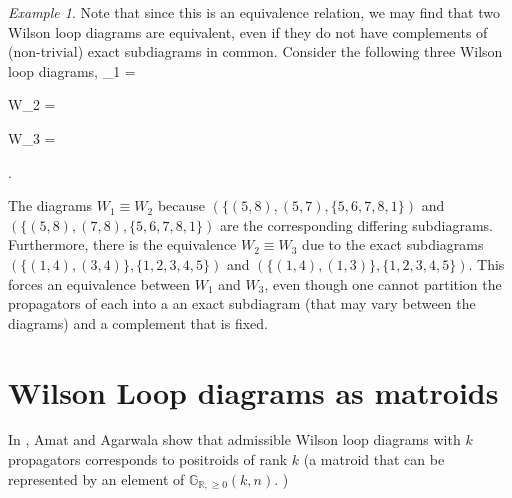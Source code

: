 \documentclass[11pt]{article}
\newcommand{\drawWLD}[2]{

\pgfmathsetmacro{\n}{#1}
\pgfmathsetmacro{\radius}{#2}
\pgfmathsetmacro{\angle}{360/\n}
    \foreach \i in {1,2,...,\n} {
      \pgfmathsetmacro{\x}{\angle*\i}
        \draw[-,shorten >=-\radius*0.1 cm,shorten <=-\radius*0.1 cm]  (\x:\radius cm)-- (\x + \angle: \radius cm);
    }

\draw (\angle:\radius) node {$\bullet$};
}
\newcommand{\drawprop}[4]{
\pgfmathsetmacro{\r}{#1}
\pgfmathsetmacro{\bumpr}{#2}
\pgfmathsetmacro{\s}{#3}
\pgfmathsetmacro{\bumps}{#4}
\pgfmathsetmacro{\perturbe}{\angle/\n}

\begin{scope}
\clip (\angle*\r:\radius) -- (\angle + \angle*\r:\radius) -- (\angle*\s:\radius) -- (\angle + \angle*\s:\radius) -- (\angle*\r:\radius);
\draw[propagator] (\angle*\r + \angle/2 + \bumpr*\perturbe:\radius) -- (\angle*\s + \angle/2 + \bumps*\perturbe:\radius);
\end{scope}
}
\newcommand{\drawnumbers}{
  \foreach \i in {1,2,...,\n} {
  \pgfmathsetmacro{\x}{\angle*\i}
  \draw (\x:\radius*1.15) node {\footnotesize \i};
}
}
\newcommand{\R}{\mathbb{R}}
\newcommand{\Gr}{\mathbb{G}_{\R, \geq 0}}
\def\bas #1\eas{\begin{align*} #1 \end{align*}}
\theoremstyle{remark}
\newtheorem{eg}[thm]{Example}
\theoremstyle{definition}
\begin{document}
\begin{eg}
Note that since this is an equivalence relation, we may find that two Wilson loop diagrams are equivalent, even if they do not have complements of (non-trivial) exact subdiagrams in common. Consider the following three Wilson loop diagrams,
\bas
W_1 =  \quad
W_2 =  \quad
W_3 =  .
\eas

The diagrams $W_1 \equiv W_2$ because $(\{(5,8), (5,7), \{5,6,7,8,1\})$ and $(\{(5,8), (7,8), \{5,6,7,8,1\})$ are the corresponding differing subdiagrams. Furthermore, there is the equivalence $W_2 \equiv W_3$ due to the exact subdiagrams $(\{(1,4), (3,4)\}, \{1,2,3,4,5\})$ and $(\{(1,4), (1,3)\}, \{1,2,3,4,5\})$. This forces an equivalence between $W_1$ and $W_3$, even though one cannot partition the propagators of each into a an exact subdiagram (that may vary between the diagrams) and a complement that is fixed.  \end{eg}

\section{Wilson Loop diagrams as matroids}

In \cite{wilsonloop}, Amat and Agarwala show that admissible Wilson loop diagrams with $k$ propagators corresponds to positroids of rank $k$ (a matroid that can be represented by an element of $\Gr(k, n)$. )
\end{document}
